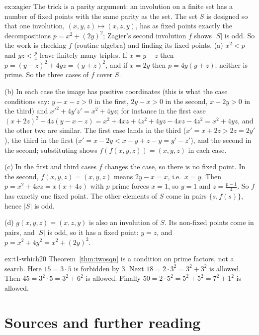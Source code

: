\begin{solution}{ex:zagier}
\idea The trick is a parity argument: an involution on a finite set has a number of fixed points with the same parity as the set. The set $S$ is designed so that one involution, $(x,y,z)\mapsto(x,z,y)$, has as fixed points exactly the decompositions $p=x^2+(2y)^2$; Zagier's second involution $f$ shows $|S|$ is odd. So the work is checking $f$ (routine algebra) and finding its fixed points.
\writeup (a) $x^2<p$ and $yz<\frac p4$ leave finitely many triples. If $x=y-z$ then $p=(y-z)^2+4yz=(y+z)^2$, and if $x=2y$ then $p=4y(y+z)$; neither is prime. So the three cases of $f$ cover $S$.

(b) In each case the image has positive coordinates (this is what the case conditions say: $y-x-z>0$ in the first, $2y-x>0$ in the second, $x-2y>0$ in the third) and $x'^2+4y'z'=x^2+4yz$; for instance in the first case $(x+2z)^2+4z(y-x-z)=x^2+4xz+4z^2+4yz-4xz-4z^2=x^2+4yz$, and the other two are similar. The first case lands in the third ($x'=x+2z>2z=2y'$), the third in the first ($x'=x-2y<x-y+z-y=y'-z'$), and the second in the second; substituting shows $f(f(x,y,z))=(x,y,z)$ in each case.

(c) In the first and third cases $f$ changes the case, so there is no fixed point. In the second, $f(x,y,z)=(x,y,z)$ means $2y-x=x$, i.e.\ $x=y$. Then $p=x^2+4xz=x(x+4z)$ with $p$ prime forces $x=1$, so $y=1$ and $z=\frac{p-1}4$. So $f$ has exactly one fixed point. The other elements of $S$ come in pairs $\{s,f(s)\}$, hence $|S|$ is odd.

(d) $g(x,y,z)=(x,z,y)$ is also an involution of $S$. Its non-fixed points come in pairs, and $|S|$ is odd, so it has a fixed point: $y=z$, and $p=x^2+4y^2=x^2+(2y)^2$.
\end{solution}

\begin{solution}{ex:t1-which20}
\idea Theorem~\ref{thm:twosqn} is a condition on prime factors, not a search.
\writeup Here $15=3\cdot 5$ is forbidden by $3$. Next $18=2\cdot 3^2=3^2+3^2$ is allowed. Then $45=3^2\cdot 5=3^2+6^2$ is allowed. Finally $50=2\cdot 5^2=5^2+5^2=7^2+1^2$ is allowed.
\end{solution}

\section*{Sources and further reading}

